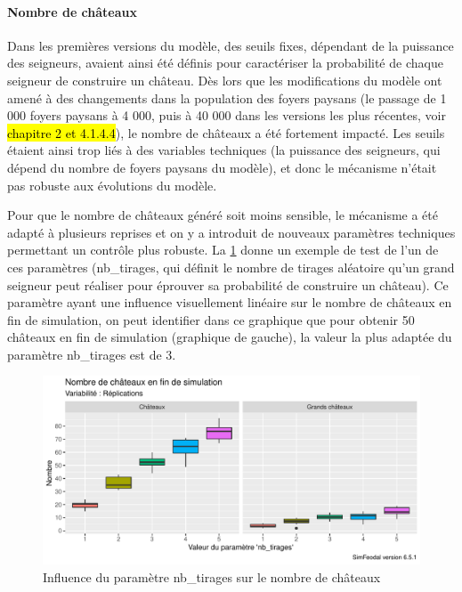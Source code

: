 \paragraph{Nombre de châteaux}

Dans les premières versions du modèle, des seuils fixes, dépendant de la puissance des seigneurs, avaient ainsi été définis pour caractériser la probabilité de chaque seigneur de construire un château.
Dès lors que les modifications du modèle ont amené à des changements dans la population des foyers paysans (le passage de 1 000 foyers paysans à 4 000, puis à 40 000 dans les versions les plus récentes, voir \hl{chapitre 2 et 4.1.4.4}), le nombre de châteaux a été fortement impacté.
Les seuils étaient ainsi trop liés à des variables techniques (la puissance des seigneurs, qui dépend du nombre de foyers paysans du modèle), et donc le mécanisme n'était pas robuste aux évolutions du modèle.

Pour que le nombre de châteaux généré soit moins sensible, le mécanisme a été adapté à plusieurs reprises et on y a introduit de nouveaux paramètres techniques permettant un contrôle plus robuste.
La \cref{fig:calibrage-param-chateaux} donne un exemple de test de l'un de ces paramètres (\textsf{nb\_tirages}, qui définit le nombre de tirages aléatoire qu'un grand seigneur peut réaliser pour éprouver sa probabilité de construire un château).
Ce paramètre ayant une influence visuellement linéaire sur le nombre de châteaux en fin de simulation, on peut identifier dans ce graphique que pour obtenir 50 châteaux en fin de simulation (graphique de gauche), la valeur la plus adaptée du paramètre \textsf{nb\_tirages} est de 3.

\begin{figure}[H]
	\centering
	\includegraphics[width=\linewidth]{img/calibrage_nombre_chateaux.pdf}
	\caption[Influence du paramètre \textsf{nb\_tirages} sur le nombre de châteaux.]{Influence du paramètre \textsf{nb\_tirages} sur le nombre de châteaux%
	}
	\label{fig:calibrage-param-chateaux}
\end{figure}

